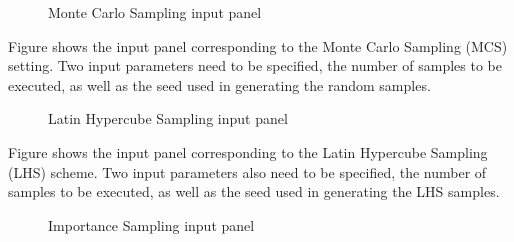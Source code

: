 \begin{figure}[!htbp]
  \caption{Monte Carlo Sampling input panel}
  \label{fig:mcs}
\end{figure}

Figure  shows the input panel corresponding to the Monte Carlo Sampling (MCS) setting. Two input parameters need to be specified, the number of samples to be executed, as well as the seed used in generating the random samples. 


\begin{figure}[!htbp]
  \caption{Latin Hypercube Sampling input panel}
  \label{fig:lhs}
\end{figure}

Figure  shows the input panel corresponding to the Latin Hypercube Sampling (LHS) scheme. Two input parameters also need to be specified, the number of samples to be executed, as well as the seed used in generating the LHS samples. 

\begin{figure}[!htbp]
  \caption{Importance Sampling input panel}
  \label{fig:is}
\end{figure}

